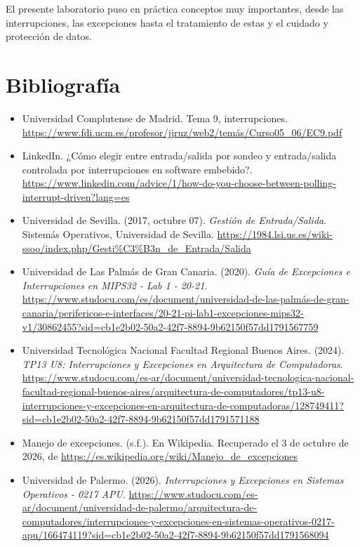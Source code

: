 \documentclass[12pt, a4paper]{article}
\begin{document}
El presente laboratorio puso en práctica conceptos muy importantes, desde las interrupciones, las excepciones hasta el tratamiento de estas y el cuidado y protección de datos.
\newpage
\section{Bibliografía}
\begin{itemize}
    \item Universidad Complutense de Madrid. Tema 9, interrupciones. \url{https://www.fdi.ucm.es/profesor/jjruz/web2/temás/Curso05_06/EC9.pdf}
    \item LinkedIn. ¿Cómo elegir entre entrada/salida por sondeo y entrada/salida controlada por interrupciones en software embebido?. \url{https://www.linkedin.com/advice/1/how-do-you-choose-between-polling-interrupt-driven?lang=es}
    \item Universidad de Sevilla. (2017, octubre 07). \textit{Gestión de Entrada/Salida}. Sistemás Operativos, Universidad de Sevilla. \url{https://1984.lsi.us.es/wiki-ssoo/index.php/Gesti%C3%B3n_de_Entrada/Salida}
    \item Universidad de Las Palmás de Gran Canaria. (2020). \textit{Guía de Excepciones e Interrupciones en MIPS32 - Lab 1 - 20-21}. \url{https://www.studocu.com/es/document/universidad-de-las-palmás-de-gran-canaria/perifericos-e-interfaces/20-21-pi-lab1-excepciones-mips32-v1/30862455?sid=cb1e2b02-50a2-42f7-8894-9b62150f57dd1791567759}
    \item Universidad Tecnológica Nacional Facultad Regional Buenos Aires. (2024). \textit{TP13 U8: Interrupciones y Excepciones en Arquitectura de Computadoras}. \url{https://www.studocu.com/es-ar/document/universidad-tecnologica-nacional-facultad-regional-buenos-aires/arquitectura-de-computadores/tp13-u8-interrupciones-y-excepciones-en-arquitectura-de-computadoras/128749411?sid=cb1e2b02-50a2-42f7-8894-9b62150f57dd1791571188}
    \item  Manejo de excepciones. (s.f.). En Wikipedia. Recuperado el 3 de octubre de 2026, de \url{https://es.wikipedia.org/wiki/Manejo_de_excepciones}
    \item Universidad de Palermo. (2026). \textit{Interrupciones y Excepciones en Sistemas Operativos - 0217 APU}. \url{https://www.studocu.com/es-ar/document/universidad-de-palermo/arquitectura-de-computadores/interrupciones-y-excepciones-en-sistemas-operativos-0217-apu/166474119?sid=cb1e2b02-50a2-42f7-8894-9b62150f57dd1791568094}
\end{itemize}
\end{document}
